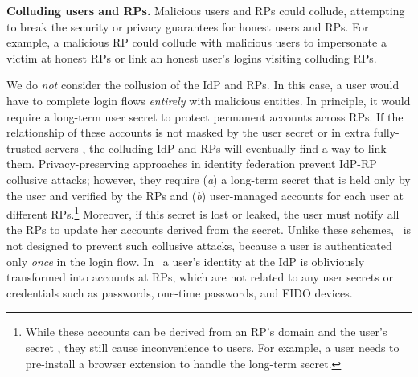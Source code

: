 \noindent \textbf{Colluding users and RPs.}
Malicious users and RPs could collude,
 attempting to break the security or privacy guarantees for honest users and RPs.
For example, a malicious RP could collude with malicious users to impersonate a victim at honest RPs or link an honest user's logins visiting colluding RPs.

We do \emph{not} consider the collusion of the IdP and RPs.
In this case, a user would have to complete login flows \emph{entirely} with malicious entities. 
In principle, it would require a long-term user secret to protect permanent accounts across RPs.
If the relationship of these accounts is not masked by the user secret or in extra fully-trusted servers \cite{miso},
 the colluding IdP and RPs will eventually find a way to link them.
Privacy-preserving approaches in identity federation \cite{ELPASSO, UnlimitID, idemix, PseudoID, Opaak, uprov} prevent IdP-RP collusive attacks;
however, they require (\emph{a}) a long-term secret that is held only by the user and verified by the RPs and (\emph{b}) user-managed accounts for each user at different RPs.\footnote{While these accounts can be derived from an RP's domain and the user's secret \cite{ELPASSO, UnlimitID, Opaak, uprov,idemix},
 they still cause inconvenience to users.
For example, a user needs to pre-install a browser extension to handle the long-term secret.}
Moreover, if this secret is lost or leaked, the user must notify all the RPs to update her accounts derived from the secret.
Unlike these schemes, \usso\ is not designed to prevent such collusive attacks,
 because a user is authenticated only \emph{once} in the login flow.
In \usso\ a user's identity at the IdP is obliviously transformed into accounts at RPs,
 which are not related to any user secrets or credentials such as passwords, one-time passwords, 
  and FIDO devices.


